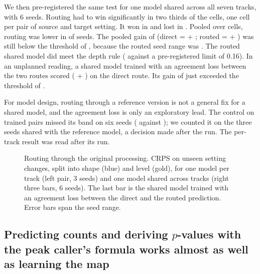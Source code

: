 \documentclass[pdflatex,sn-mathphys-num]{sn-jnl}
\newcommand{\lit}[1]{#1}
\begin{document}
We then pre-registered the same test for one model shared across all seven tracks, with
\lit{6} seeds. Routing had to win significantly in two thirds of the \nCells{} cells, one cell
per pair of source and target setting. It won in \nCellWin{} and lost in \nCellWorse{}. Pooled
over cells, routing was lower in \nSeedPos{} of \nSeedAll{} seeds. The pooled gain of \pGain{}
(direct \pDir{} = \pDirOS{} + \pDirSE{}; routed \pCh{} = \pChOS{} + \pChSE{}) was still below
the threshold of \pGainBar{}, because the routed seed range was \pChS{}. The routed shared model
did meet the depth rule (\pLawCh{} against a pre-registered limit of \lit{0.16}). In an
unplanned reading, a shared model trained with an agreement loss between the two routes
scored \pAg{} (\pAgOS{} + \pAgSE{}) on the direct route. Its gain of \pAgGain{} just exceeded
the threshold of \pAgBar{}.

For model design, routing through a reference version is not a general fix for a shared model,
and the agreement loss is only an exploratory lead. The control on trained pairs missed its
band on six seeds (\nOneGap{} against \nOneBar{}); we counted it on the three seeds shared with
the reference model, a decision made after the run. The per-track result was read after its
run.

\begin{figure}[t]
\centering
{}
\caption{Routing through the original processing. CRPS on unseen setting changes, split into
shape (blue) and level (gold), for one model per track (left pair, \lit{3} seeds) and one model
shared across tracks (right three bars, \lit{6} seeds). The last bar is the shared model
trained with an agreement loss between the direct and the routed prediction. Error bars span
the seed range.}\label{fig:route}
\end{figure}

\subsection{Predicting counts and deriving \texorpdfstring{$p$}{p}-values with the peak caller's formula works almost as well as learning the map}\label{sec:r9}
\end{document}
